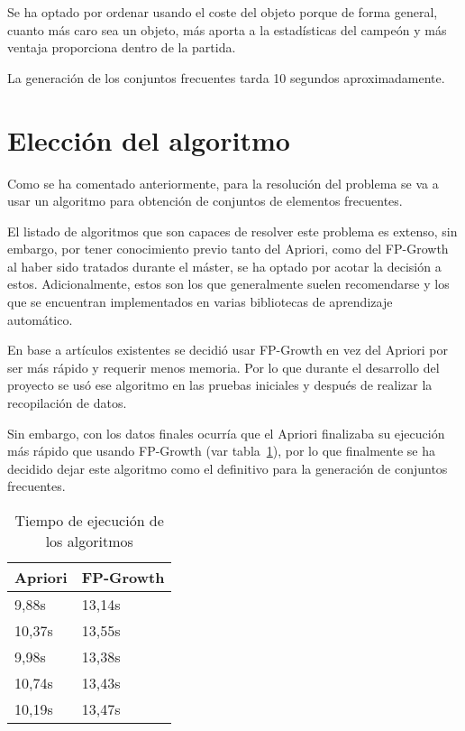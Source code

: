 Se ha optado por ordenar usando el coste del objeto porque de forma general, cuanto más caro sea un objeto, más aporta a la estadísticas del campeón y más ventaja proporciona dentro de la partida.

La generación de los conjuntos frecuentes tarda 10 segundos aproximadamente.

\section{Elección del algoritmo}
Como se ha comentado anteriormente, para la resolución del problema se va a usar un algoritmo para obtención de conjuntos de elementos frecuentes.

El listado de algoritmos \cite{chee_jaafar_aziz_hasan_yeoh_2018} que son capaces de resolver este problema es extenso, sin embargo, por tener conocimiento previo tanto del Apriori, como del FP-Growth al haber sido tratados durante el máster, se ha optado por acotar la decisión a estos. Adicionalmente, estos son los que generalmente suelen recomendarse y los que se encuentran implementados en varias bibliotecas de aprendizaje automático.

En base a artículos existentes \cite{chonyy_2020_apriori}\cite{chonyy_2020_fpgrowth} se decidió usar FP-Growth en vez del Apriori por ser más rápido y requerir menos memoria. Por lo que durante el desarrollo del proyecto se usó ese algoritmo en las pruebas iniciales y después de realizar la recopilación de datos.

Sin embargo, con los datos finales ocurría que el Apriori finalizaba su ejecución más rápido que usando FP-Growth (var tabla~\ref{tab:tiempo-algos}), por lo que finalmente se ha decidido dejar este algoritmo como el definitivo para la generación de conjuntos frecuentes.

\begin{table}[h]
	\centering
	\begin{tabular}{ll}\toprule
		\textbf{Apriori} & \textbf{FP-Growth} \\
		\midrule
		9,88s   & 13,14s    \\
		10,37s  & 13,55s    \\
		9,98s   & 13,38s    \\
		10,74s  & 13,43s    \\
		10,19s  & 13,47s    \\ \bottomrule
	\end{tabular}
	\caption{Tiempo de ejecución de los algoritmos}
	\label{tab:tiempo-algos}
\end{table}